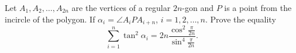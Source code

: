 Let $A_1,A_2,\ldots,A_{2n}$ are the vertices of a regular $2n$-gon and $P$ is a point from the incircle of the polygon. If $\alpha_i=\angle A_iPA_{i+n}$, $i=1,2,\ldots,n$. Prove the equality
$$\sum_{i=1}^n\tan^2\alpha_i=2n\frac{\cos^2\frac\pi{2n}}{\sin^4\frac\pi{2n}}.$$